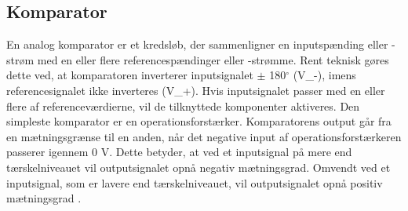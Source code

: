 \subsection{Komparator}\label{Komparatorafsnit}
En analog komparator er et kredsløb, der sammenligner en inputspænding eller -strøm med en eller flere referencespændinger eller -strømme. Rent teknisk gøres dette ved, at komparatoren inverterer inputsignalet $\pm$ 180$^{\circ}$ (V_{-}), imens referencesignalet ikke inverteres (V_{+}). Hvis inputsignalet passer med en eller flere af referenceværdierne, vil de tilknyttede komponenter aktiveres. Den simpleste komparator er en operationsforstærker.  
Komparatorens output går fra en mætningsgrænse til en anden, når det negative input af operationsforstærkeren passerer igennem 0 V. Dette betyder, at ved et inputsignal på mere end tærskelniveauet vil outputsignalet opnå negativ mætningsgrad. Omvendt ved et inputsignal, som er lavere end tærskelniveauet, vil outputsignalet opnå positiv mætningsgrad . \cite{webster2009} 

